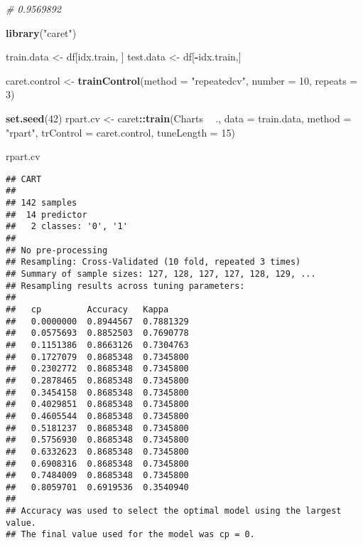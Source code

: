 \documentclass[
]{article}
\newenvironment{Shaded}{\begin{snugshade}}{\end{snugshade}}
\newcommand{\CommentTok}[1]{\textcolor[rgb]{0.56,0.35,0.01}{\textit{#1}}}
\newcommand{\DataTypeTok}[1]{\textcolor[rgb]{0.13,0.29,0.53}{#1}}
\newcommand{\DecValTok}[1]{\textcolor[rgb]{0.00,0.00,0.81}{#1}}
\newcommand{\KeywordTok}[1]{\textcolor[rgb]{0.13,0.29,0.53}{\textbf{#1}}}
\newcommand{\NormalTok}[1]{#1}
\newcommand{\OperatorTok}[1]{\textcolor[rgb]{0.81,0.36,0.00}{\textbf{#1}}}
\newcommand{\StringTok}[1]{\textcolor[rgb]{0.31,0.60,0.02}{#1}}
\begin{document}
\begin{Shaded}
\begin{Highlighting}[]
\CommentTok{# 0.9569892}

\KeywordTok{library}\NormalTok{(}\StringTok{"caret"}\NormalTok{)}

\NormalTok{train.data <-}\StringTok{ }\NormalTok{df[idx.train, ]}
\NormalTok{test.data <-}\StringTok{ }\NormalTok{df[}\OperatorTok{-}\NormalTok{idx.train,]}

\NormalTok{caret.control <-}\StringTok{ }\KeywordTok{trainControl}\NormalTok{(}\DataTypeTok{method =} \StringTok{"repeatedcv"}\NormalTok{,}
                              \DataTypeTok{number =} \DecValTok{10}\NormalTok{,}
                              \DataTypeTok{repeats =} \DecValTok{3}\NormalTok{)}

\KeywordTok{set.seed}\NormalTok{(}\DecValTok{42}\NormalTok{)}
\NormalTok{rpart.cv <-}\StringTok{ }\NormalTok{caret}\OperatorTok{::}\KeywordTok{train}\NormalTok{(Charts }\OperatorTok{~}\StringTok{ }\NormalTok{., }
                         \DataTypeTok{data =}\NormalTok{ train.data,}
                         \DataTypeTok{method =} \StringTok{"rpart"}\NormalTok{,}
                         \DataTypeTok{trControl =}\NormalTok{ caret.control,}
                         \DataTypeTok{tuneLength =} \DecValTok{15}\NormalTok{)}

\NormalTok{rpart.cv}
\end{Highlighting}
\end{Shaded}

\begin{verbatim}
## CART 
## 
## 142 samples
##  14 predictor
##   2 classes: '0', '1' 
## 
## No pre-processing
## Resampling: Cross-Validated (10 fold, repeated 3 times) 
## Summary of sample sizes: 127, 128, 127, 127, 128, 129, ... 
## Resampling results across tuning parameters:
## 
##   cp         Accuracy   Kappa    
##   0.0000000  0.8944567  0.7881329
##   0.0575693  0.8852503  0.7690778
##   0.1151386  0.8663126  0.7304763
##   0.1727079  0.8685348  0.7345800
##   0.2302772  0.8685348  0.7345800
##   0.2878465  0.8685348  0.7345800
##   0.3454158  0.8685348  0.7345800
##   0.4029851  0.8685348  0.7345800
##   0.4605544  0.8685348  0.7345800
##   0.5181237  0.8685348  0.7345800
##   0.5756930  0.8685348  0.7345800
##   0.6332623  0.8685348  0.7345800
##   0.6908316  0.8685348  0.7345800
##   0.7484009  0.8685348  0.7345800
##   0.8059701  0.6919536  0.3540940
## 
## Accuracy was used to select the optimal model using the largest value.
## The final value used for the model was cp = 0.
\end{verbatim}
\end{document}
